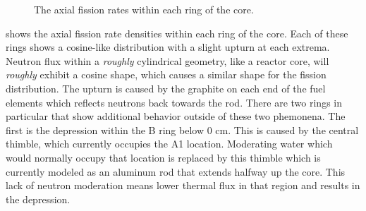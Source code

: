 \begin{figure}[htb]
\caption[Axial Fission Rates]{The axial fission rates within each ring of the core.}
\label{fig:axial_rr_density}
\end{figure}

\clearpage

 shows the axial fission rate densities within each ring of the core.
Each of these rings shows a cosine-like distribution with a slight upturn at each extrema.
Neutron flux within a {\it roughly} cylindrical geometry, like a reactor core, will {\it roughly} exhibit a cosine shape, which causes a similar shape for the fission distribution.
The upturn is caused by the graphite on each end of the fuel elements which reflects neutrons back towards the rod.
There are two rings in particular that show additional behavior outside of these two phemonena.
The first is the depression within the B ring below 0 cm.
This is caused by the central thimble, which currently occupies the A1 location.
Moderating water which would normally occupy that location is replaced by this thimble which is currently modeled as an aluminum rod that extends halfway up the core.
This lack of neutron moderation means lower thermal flux in that region and results in the depression.

